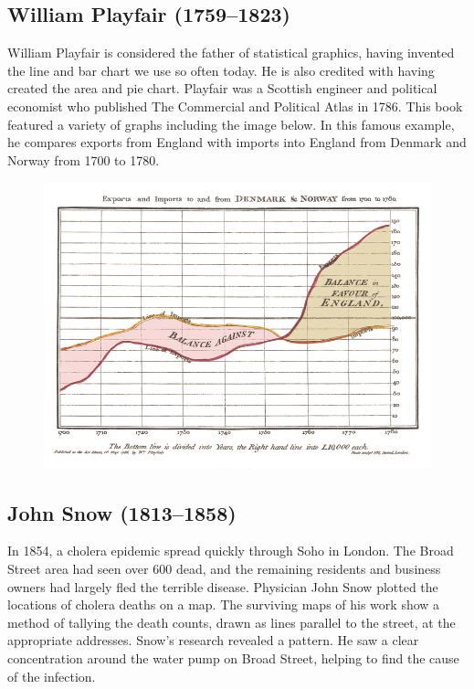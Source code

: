 \documentclass[]{book}
\theoremstyle{definition}
\theoremstyle{definition}
\theoremstyle{definition}
\theoremstyle{remark}
\begin{document}
\subsection{William Playfair
(1759--1823)}\label{william-playfair-17591823}

William Playfair is considered the father of statistical graphics,
having invented the line and bar chart we use so often today. He is also
credited with having created the area and pie chart. Playfair was a
Scottish engineer and political economist who published The Commercial
and Political Atlas in 1786. This book featured a variety of graphs
including the image below. In this famous example, he compares exports
from England with imports into England from Denmark and Norway from 1700
to 1780.

\begin{figure}
\centering
\includegraphics{images/Playfair.png}
\caption{}
\end{figure}

\subsection{John Snow (1813--1858)}\label{john-snow-18131858}

In 1854, a cholera epidemic spread quickly through Soho in London. The
Broad Street area had seen over 600 dead, and the remaining residents
and business owners had largely fled the terrible disease. Physician
John Snow plotted the locations of cholera deaths on a map. The
surviving maps of his work show a method of tallying the death counts,
drawn as lines parallel to the street, at the appropriate addresses.
Snow's research revealed a pattern. He saw a clear concentration around
the water pump on Broad Street, helping to find the cause of the
infection.
\end{document}
